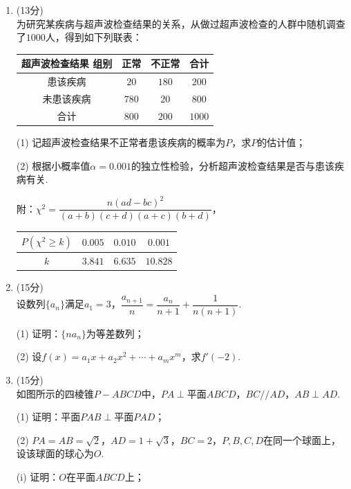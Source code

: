 \documentclass[12pt,a4paper]{article}
\providecommand{\varparallel}{\mathrel{/\!/}}
\begin{document}
	\begin{enumerate}[leftmargin=*,label=\arabic*.,resume,itemsep=1.2ex]
		\item (13分)\\
		为研究某疾病与超声波检查结果的关系，从做过超声波检查的人群中随机调查了$1000$人，得到如下列联表：
		\begin{center}
			\begin{tabular}{|c|c|c|c|}
				\hline
				超声波检查结果 组别 & 正常 & 不正常 & 合计 \\
				\hline
				患该疾病 & $20$ & $180$ & $200$ \\
				\hline
				未患该疾病 & $780$ & $20$ & $800$ \\
				\hline
				合计 & $800$ & $200$ & $1000$ \\
				\hline
			\end{tabular}
		\end{center}
		(1) 记超声波检查结果不正常者患该疾病的概率为$P$，求$P$的估计值；
		
		(2) 根据小概率值$\alpha=0.001$的独立性检验，分析超声波检查结果是否与患该疾病有关.
		
		附：$\chi^2=\dfrac{n(ad-bc)^2}{(a+b)(c+d)(a+c)(b+d)}$，
		\begin{center}
			\begin{tabular}{|c|c|c|c|}
				\hline
				$P(\chi^2\ge k)$ & $0.005$ & $0.010$ & $0.001$ \\
				\hline
				$k$ & $3.841$ & $6.635$ & $10.828$ \\
				\hline
			\end{tabular}
		\end{center}
		\newpage
		\item (15分)\\
		设数列$\{a_n\}$满足$a_1=3$，$\dfrac{a_{n+1}}{n}=\dfrac{a_n}{n+1}+\dfrac{1}{n(n+1)}$.
		
		(1) 证明：$\{na_n\}$为等差数列；
		
		(2) 设$f(x)=a_1x+a_2x^2+\cdots+a_mx^m$，求$f'(-2)$.
		
		\vspace{0.2\textheight}
		\item (15分)\\
		如图所示的四棱锥$P-ABCD$中，$PA\perp$平面$ABCD$，$BC\varparallel AD$，$AB\perp AD$.
		
		(1) 证明：平面$PAB\perp$平面$PAD$；
		
		(2) $PA=AB=\sqrt2$，$AD=1+\sqrt3$，$BC=2$，$P,B,C,D$在同一个球面上，设该球面的球心为$O$.
		
		\hspace*{2em}(i) 证明：$O$在平面$ABCD$上；
		

\end{enumerate}
\end{document}
